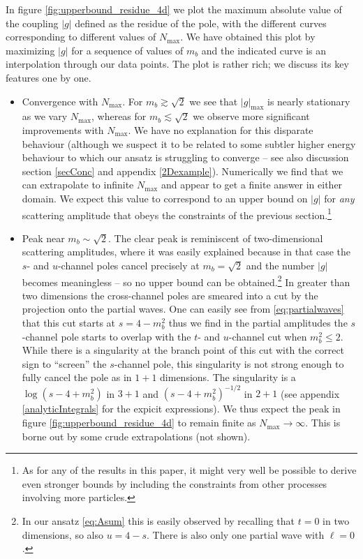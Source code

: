 \documentclass[12pt]{article}
\newcommand{\<}{{\langle}}
\renewcommand{\>}{{\rangle}}
\begin{document}
In figure \ref{fig:upperbound_residue_4d} we plot the maximum absolute value of the coupling $|g|$ defined as the residue of the pole, with the different curves corresponding to different values of $N_{\max}$. We have obtained this plot by maximizing $|g|$ for a sequence of values of $m_b$ and the indicated curve is an interpolation through our data points. The plot is rather rich; we discuss its key features one by one.
\begin{itemize}
  \item Convergence with $N_{\max}$. For $m_b \gtrsim \sqrt{2}$ we see that $|g|_{\max}$ is nearly stationary as we vary $N_{\max}$, whereas for $m_b \lesssim \sqrt{2}$ we observe more significant improvements with $N_{\max}$. We have no explanation for this disparate behaviour (although we suspect it to be related to some subtler higher energy behaviour to which our ansatz is struggling to converge -- see also discussion section \ref{secConc} and appendix \ref{2Dexample}). Numerically we find that we can extrapolate to infinite $N_{\max}$ and appear to get a finite answer in either domain. We expect this value to correspond to an upper bound on $|g|$ for \emph{any} scattering amplitude that obeys the constraints of the previous section.\footnote{As for any of the results in this paper, it might very well be possible to derive even stronger bounds by including the constraints from other processes involving more particles.}
  \item Peak near $m_b \sim \sqrt{2}$. The clear peak is reminiscent of two-dimensional scattering amplitudes, where it was easily explained because in that case the $s$- and $u$-channel poles cancel precisely at $m_b = \sqrt{2}$ and the number $|g|$ becomes meaningless -- so no upper bound can be obtained.\footnote{In our ansatz \eqref{eq:Asum} this is easily observed by recalling that $t = 0$ in two dimensions, so also $u = 4 - s$. There is also only one partial wave with $\ell = 0$.} In greater than two dimensions the cross-channel poles are smeared into a cut by the projection onto the partial waves.  One can easily see from \eqref{eq:partialwaves} that this cut starts at $s=4-m_{b}^{2}$ thus we find in the partial amplitudes the $s$-channel pole starts to overlap with the $t$- and $u$-channel cut when $m_{b}^{2}\le 2$.  While there is a singularity at the branch point of this cut with the correct sign to ``screen'' the $s$-channel pole, this singularity is not strong enough to fully cancel the pole as in $1+1$ dimensions.  The singularity is a $\log(s-4+m_{b}^{2})$ in $3+1$ and $(s-4+m_{b}^{2})^{-1/2}$ in $2+1$ (see appendix \ref{analyticIntegrals} for the expicit expressions). We thus expect the peak in figure \ref{fig:upperbound_residue_4d} to remain finite as $N_{\max} \to \infty$. This is borne out by some crude extrapolations (not shown).

\end{itemize}
\end{document}
